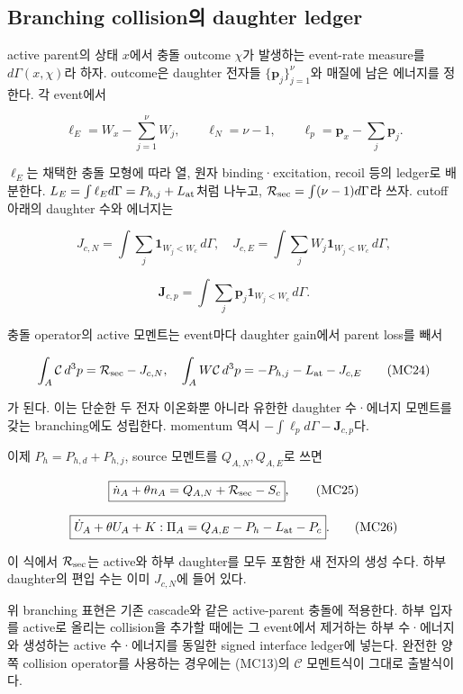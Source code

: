 \documentclass[11pt,a4paper]{article}
\begin{document}
\hypertarget{branching-collisionuxc758-daughter-ledger}{%
\subsection{Branching collision의 daughter ledger}\label{branching-collisionuxc758-daughter-ledger}}

active parent의 상태 \(x\)에서 충돌 outcome \(\chi\)가 발생하는 event-rate measure를 \(d\Gamma(x,\chi)\)라 하자. outcome은 daughter 전자들 \(\{\boldsymbol p_j\}_{j=1}^{\nu}\)와 매질에 남은 에너지를 정한다. 각 event에서

\[
\ell_E=W_x-\sum_{j=1}^{\nu}W_j,
\qquad\ell_{N}=\nu-1,
\qquad\boldsymbol\ell_p=\boldsymbol p_x-\sum_j\boldsymbol p_j.
\tag{MC21}
\]

\(\ell_E\)는 채택한 충돌 모형에 따라 열, 원자 binding·excitation, recoil 등의 ledger로 배분한다. \(L_E=\int\ell_Ed\Gamma=P_{h,j}+L_{\rm at}\)처럼 나누고, \(\mathcal R_{\rm sec}=\int(\nu-1)d\Gamma\)라 쓰자. cutoff 아래의 daughter 수와 에너지는

\[
J_{c,N}=\int\sum_j\mathbf1_{W_j<W_c}\,d\Gamma,
\quad
J_{c,E}=\int\sum_jW_j\mathbf1_{W_j<W_c}\,d\Gamma,
\tag{MC22}
\]

\[
\boldsymbol J_{c,p}=\int\sum_j\boldsymbol p_j\mathbf1_{W_j<W_c}\,d\Gamma.
\tag{MC23}
\]

충돌 operator의 active 모멘트는 event마다 daughter gain에서 parent loss를 빼서

\[
\int_A\mathcal C\,d^3p=\mathcal R_{\rm sec}-J_{c,N},
\quad
\int_AW\mathcal C\,d^3p=-P_{h,j}-L_{\rm at}-J_{c,E}
\tag{MC24}
\]

가 된다. 이는 단순한 두 전자 이온화뿐 아니라 유한한 daughter 수·에너지 모멘트를 갖는 branching에도 성립한다. momentum 역시 \(-\int\boldsymbol\ell_pd\Gamma-\boldsymbol J_{c,p}\)다.

이제 \(P_h=P_{h,d}+P_{h,j}\), source 모멘트를 \(Q_{A,N},Q_{A,E}\)로 쓰면

\[
\boxed{\dot n_A+\theta n_A=Q_{A,N}+\mathcal R_{\rm sec}-S_c},
\tag{MC25}
\]

\[
\boxed{\dot U_A+\theta U_A+K:\Pi_A
=Q_{A,E}-P_h-L_{\rm at}-P_c}.
\tag{MC26}
\]

이 식에서 \(\mathcal R_{\rm sec}\)는 active와 하부 daughter를 모두 포함한 새 전자의 생성 수다. 하부 daughter의 편입 수는 이미 \(J_{c,N}\)에 들어 있다.

위 branching 표현은 기존 cascade와 같은 active-parent 충돌에 적용한다. 하부 입자를 active로 올리는 collision을 추가할 때에는 그 event에서 제거하는 하부 수·에너지와 생성하는 active 수·에너지를 동일한 signed interface ledger에 넣는다. 완전한 양쪽 collision operator를 사용하는 경우에는 (MC13)의 \(\mathcal C\) 모멘트식이 그대로 출발식이다.
\end{document}

